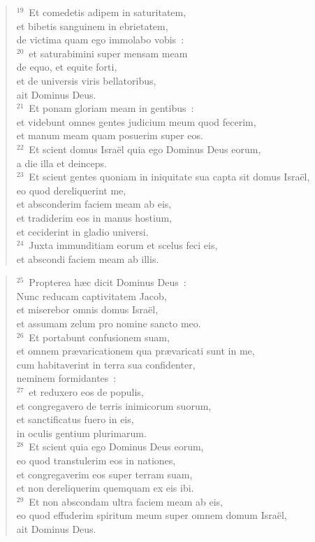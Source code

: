 \begin{verse}
${}^{19}$~Et comedetis adipem in saturitatem,\\ et bibetis sanguinem in ebrietatem,\\ de victima quam ego immolabo vobis~:\\
${}^{20}$~et saturabimini super mensam meam\\ de equo, et equite forti,\\ et de universis viris bellatoribus,\\ ait Dominus Deus.\\
${}^{21}$~Et ponam gloriam meam in gentibus~:\\ et videbunt omnes gentes judicium meum quod fecerim,\\ et manum meam quam posuerim super eos.\\
${}^{22}$~Et scient domus Isra\"el quia ego Dominus Deus eorum,\\ a die illa et deinceps.\\
${}^{23}$~Et scient gentes quoniam in iniquitate sua capta sit domus Isra\"el,\\ eo quod dereliquerint me,\\ et absconderim faciem meam ab eis,\\ et tradiderim eos in manus hostium,\\ et ceciderint in gladio universi.\\
${}^{24}$~Juxta immunditiam eorum et scelus feci eis,\\ et abscondi faciem meam ab illis.\end{verse}


\begin{verse}${}^{25}$~Propterea h\ae c dicit Dominus Deus~:\\ Nunc reducam captivitatem Jacob,\\ et miserebor omnis domus Isra\"el,\\ et assumam zelum pro nomine sancto meo.\\
${}^{26}$~Et portabunt confusionem suam,\\ et omnem pr\ae varicationem qua pr\ae varicati sunt in me,\\ cum habitaverint in terra sua confidenter,\\ neminem formidantes~:\\
${}^{27}$~et reduxero eos de populis,\\ et congregavero de terris inimicorum suorum,\\ et sanctificatus fuero in eis,\\ in oculis gentium plurimarum.\\
${}^{28}$~Et scient quia ego Dominus Deus eorum,\\ eo quod transtulerim eos in nationes,\\ et congregaverim eos super terram suam,\\ et non dereliquerim quemquam ex eis ibi.\\
${}^{29}$~Et non abscondam ultra faciem meam ab eis,\\ eo quod effuderim spiritum meum super omnem domum Isra\"el,\\ ait Dominus Deus.\end{verse}



